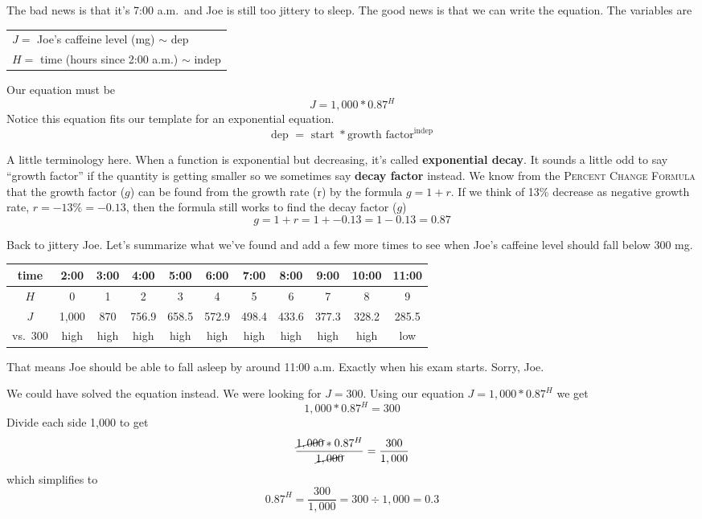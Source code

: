 The bad news is that it's 7:00 a.m.\ and Joe is still too jittery to sleep. 
The good news is that we can write the equation.  The variables are 
\begin{center}
\begin{tabular} {l} 
$J=$ Joe's caffeine level (mg) $\sim$ dep \\ 
$H =$ time (hours since 2:00 a.m.) $\sim$ indep \\
\end{tabular}
\end{center}
Our equation must be $$ J = 1,000 \ast0.87^H$$
Notice this equation fits our template for an exponential equation.
$$\text{dep }=\text{ start } \ast \text{growth factor}^{\text{indep}}$$

A little terminology here. When a function is exponential but decreasing, it's called \textbf{exponential decay}.  It sounds a little odd to say ``growth factor'' if the quantity is getting smaller so we sometimes say \textbf{decay factor} instead.   We know from the \textsc{Percent Change Formula} that the growth factor ($g$) can be found from the growth rate (r) by the formula $g=1+r$.  If we think of 13\% decrease as negative growth rate, $r=-13\%=-0.13$, then the formula still works to find the decay factor ($g$)
$$g= 1 + r = 1 + -0.13 = 1-0.13 = 0.87$$  

Back to jittery Joe.  Let's summarize what we've found and add a few more times to see when Joe's caffeine level should fall below 300 mg.  
\begin{center}
\begin{tabular} {|c| |c |c |c |c |c |c |c |c |c |c|}\hline
time & 2:00 & 3:00  & 4:00 & 5:00  & 6:00  & 7:00 & 8:00 & 9:00 & 10:00 & 11:00 \\ \hline
$H$ & 0 & 1 & 2 & 3 & 4 & 5 & 6 & 7 & 8 & 9\\ \hline
$J$ & 1,000 & 870 & 756.9 & 658.5 & 572.9 & 498.4 & 433.6 & 377.3 & 328.2 & 285.5 \\ \hline
vs.\ 300 & high & high& high& high& high& high& high& high& high& low\\ \hline
\end{tabular}
\end{center}
That means Joe should be able to fall asleep by around 11:00 a.m.  Exactly when his exam starts.  Sorry, Joe.

We could have solved the equation instead.  We were looking for $J = 300$.  Using our equation $J = 1,000 \ast 0.87^H$ we get
$$ 1,000 \ast 0.87^H=300$$
Divide each side 1,000 to get
$$ \frac{\cancel{1,000} \ast 0.87^H}{\cancel{1,000}}= \frac{300}{1,000}$$
which simplifies to $$0.87^H = \frac{300}{1,000} = 300 \div 1,000 = 0.3$$

